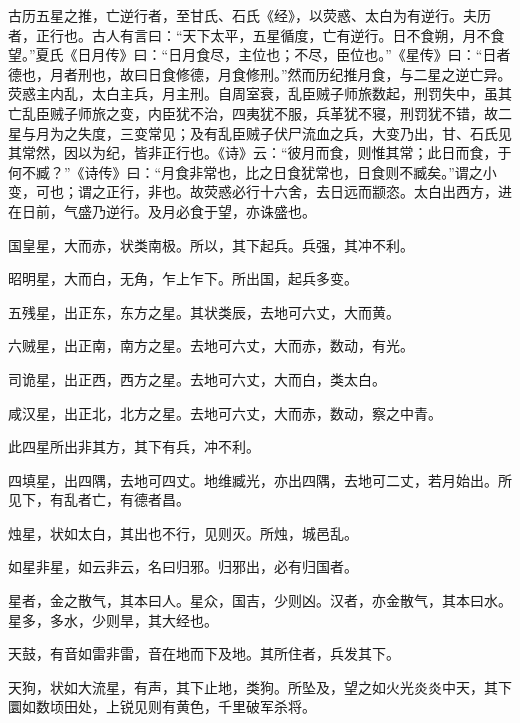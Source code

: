 \documentclass[12pt,UTF8]{ctexbook}
\begin{document}
古历五星之推，亡逆行者，至甘氏、石氏《经》，以荧惑、太白为有逆行。夫历者，正行也。古人有言曰：“天下太平，五星循度，亡有逆行。日不食朔，月不食望。”夏氏《日月传》曰：“日月食尽，主位也；不尽，臣位也。”《星传》曰：“日者德也，月者刑也，故曰日食修德，月食修刑。”然而历纪推月食，与二星之逆亡异。荧惑主内乱，太白主兵，月主刑。自周室衰，乱臣贼子师旅数起，刑罚失中，虽其亡乱臣贼子师旅之变，内臣犹不治，四夷犹不服，兵革犹不寝，刑罚犹不错，故二星与月为之失度，三变常见；及有乱臣贼子伏尸流血之兵，大变乃出，甘、石氏见其常然，因以为纪，皆非正行也。《诗》云：“彼月而食，则惟其常；此日而食，于何不臧？”《诗传》曰：“月食非常也，比之日食犹常也，日食则不臧矣。”谓之小变，可也；谓之正行，非也。故荧惑必行十六舍，去日远而颛恣。太白出西方，进在日前，气盛乃逆行。及月必食于望，亦诛盛也。



国皇星，大而赤，状类南极。所以，其下起兵。兵强，其冲不利。



昭明星，大而白，无角，乍上乍下。所出国，起兵多变。



五残星，出正东，东方之星。其状类辰，去地可六丈，大而黄。



六贼星，出正南，南方之星。去地可六丈，大而赤，数动，有光。



司诡星，出正西，西方之星。去地可六丈，大而白，类太白。



咸汉星，出正北，北方之星。去地可六丈，大而赤，数动，察之中青。



此四星所出非其方，其下有兵，冲不利。



四填星，出四隅，去地可四丈。地维臧光，亦出四隅，去地可二丈，若月始出。所见下，有乱者亡，有德者昌。



烛星，状如太白，其出也不行，见则灭。所烛，城邑乱。



如星非星，如云非云，名曰归邪。归邪出，必有归国者。



星者，金之散气，其本曰人。星众，国吉，少则凶。汉者，亦金散气，其本曰水。星多，多水，少则旱，其大经也。



天鼓，有音如雷非雷，音在地而下及地。其所住者，兵发其下。



天狗，状如大流星，有声，其下止地，类狗。所坠及，望之如火光炎炎中天，其下圜如数顷田处，上锐见则有黄色，千里破军杀将。
\end{document}
